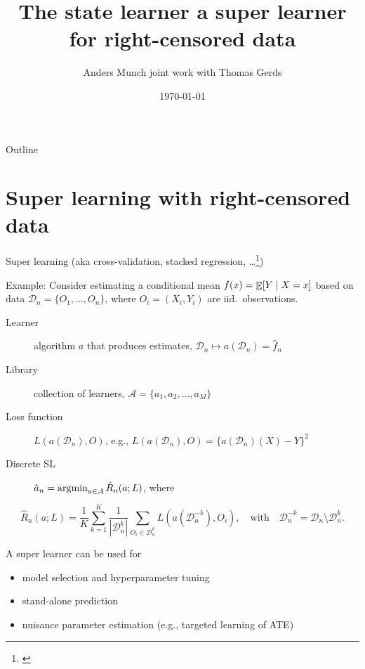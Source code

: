 \documentclass[smaller]{beamer}\usepackage{listings}
\author{Anders Munch \newline \small joint work with Thomas Gerds}
\date{\today}
\title{The state learner \newline \normalsize a super learner for right-censored data}
\begin{document}
\maketitle
\begin{frame}{Outline}
\tableofcontents
\end{frame}

\section{Super learning with right-censored data}
\label{sec:org1a3ec28}
\begin{frame}[label={sec:org20c23bb}]{Super learning \small (aka cross-validation, stacked regression, \ldots{}\footnote{\cite{stone1974cross,geisser1975predictive,wolpert1992stacked,breiman1996stacked,van2007super}})}
\small

\color{bblue}Example: \color{black} Consider estimating a conditional mean \(f(x) = {\mathop{{\mathbb{E}}}}[Y \mid X=x]\) based on data \(\mathcal{D}_n = \{O_1, \dots, O_n\}\), where \(O_i = (X_i, Y_i)\) are iid.~observations.

\vfill

\begin{description}
\item[{Learner}] algorithm \(a\) that produces estimates, \(\mathcal{D}_n \mapsto
  a(\mathcal{D}_n) = \hat f_n\)
\item[{Library}] collection of learners, \(\mathcal{A} = \{a_1, a_2, \dots, a_M \}\)
\item[{Loss function}] \(L(a(\mathcal{D}_n), O)\), e.g., \(L(a(\mathcal{D}_n), O)
  = \{a(\mathcal{D}_n)(X) - Y\}^2\) \pause
\item[{Discrete SL}] \(\hat{a}_n = \operatorname*{\arg\!\min}_{a\in\mathcal A}\hat{R}_n(a;
  L)\), where
\end{description}
\begin{equation*}
  \hat{R}_n(a; L) =
  \frac{1}{K}\sum_{k=1}^{K}
  \frac{1}{| \mathcal{D}_n^{k} |}\sum_{O_i \in \mathcal{D}_n^{k}}
  L
  {
    \left(
      a{ (\mathcal{D}_n^{-k})}
      , O_i
    \right)
  },
  \quad \text{with} \quad
  \mathcal{D}_n^{-k} = \mathcal{D}_n \setminus \mathcal{D}_n^{k}.
\end{equation*}


\vfill \pause

A super learner can be used for

\begin{itemize}
\item model selection and hyperparameter tuning
\item stand-alone prediction
\item nuisance parameter estimation (e.g., targeted learning of ATE)
\end{itemize}
\end{frame}
\end{document}
